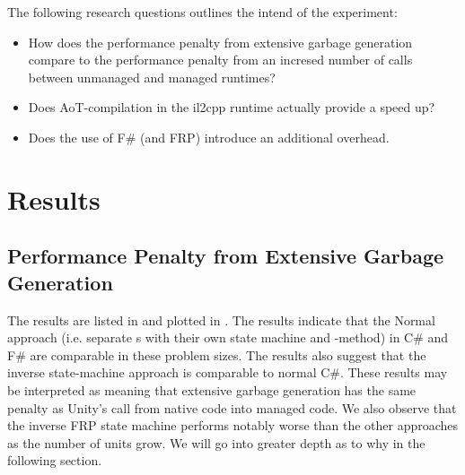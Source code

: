 The following research questions outlines the intend of the experiment:
\begin{itemize}
    \item How does the performance penalty from extensive garbage generation compare to the performance penalty from an incresed number of calls between unmanaged and managed runtimes?
    \item Does \gls{AoT}-compilation in the il2cpp runtime actually provide a speed up?
    \item Does the use of F\# (and \gls{FRP}) introduce an additional overhead.
\end{itemize}

\section{Results}
\metasheep

\subsection{Performance Penalty from Extensive Garbage Generation}
The results are listed in  and plotted in . The results indicate that the Normal approach (i.e. separate s with their own state machine and -method) in C\# and F\# are comparable in these problem sizes. The results also suggest that the inverse state-machine approach is comparable to normal C\#. These results may be interpreted as meaning that extensive garbage generation has the same penalty as Unity's call from native code into managed code. We also observe that the inverse FRP state machine performs notably worse than the other approaches as the number of units grow. We will go into greater depth as to why in the following section.

\begin{table}[H]
    \caption{Average framerate when simulating the given number of units in Unity's Mono runtime.}
    \label{tab:unity:ai}
\end{table}

